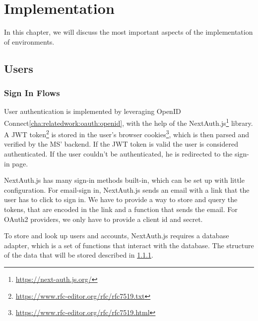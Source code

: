 \chapter{Implementation}
\label{cha:implementation}

In this chapter, we will discuss the most important aspects of the implementation of
environments.



\section{Users}


%

\subsection{Sign In Flows}

User authentication is implemented by leveraging OpenID Connect\ref{cha:relatedwork:oauth:openid},
with the help of the NextAuth.js\footnote{\url{https://next-auth.js.org/}} library.
A JWT token\footnote{\url{https://www.rfc-editor.org/rfc/rfc7519.txt}}
is stored in the user's browser cookies\footnote{\url{https://www.rfc-editor.org/rfc/rfc7519.html}},
which is then parsed and verified by the MS' backend.
If the JWT token is valid the user is considered authenticated.
If the user couldn't be authenticated, he is redirected to the sign-in page.

NextAuth.js has many sign-in methods built-in, which can be set up with little configuration.
For email-sign in, NextAuth.js sends an email with a link that the user has to click to
sign in.
We have to provide a way to store and query the tokens, that are encoded in the link and a
function that sends the email.
For OAuth2 providers, we only have to provide a client id and secret.

To store and look up users and accounts, NextAuth.js requires a database adapter,
which is a set of functions that interact with the database.
The structure of the data that will be stored described in \ref{}.

